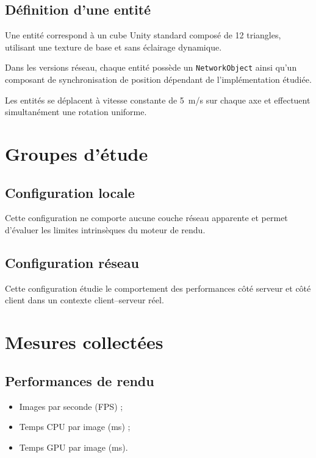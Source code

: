 \documentclass[11pt,a4paper]{article}
\begin{document}
\subsection{Définition d'une entité}

Une entité correspond à un cube Unity standard composé de 12 triangles, utilisant une texture de base et sans éclairage dynamique.

Dans les versions réseau, chaque entité possède un \texttt{NetworkObject} ainsi qu'un composant de synchronisation de position dépendant de l'implémentation étudiée.

Les entités se déplacent à vitesse constante de 5~m/s sur chaque axe et effectuent simultanément une rotation uniforme.

\section{Groupes d'étude}

\subsection{Configuration locale}

Cette configuration ne comporte aucune couche réseau apparente et permet d'évaluer les limites intrinsèques du moteur de rendu.

\subsection{Configuration réseau}

Cette configuration étudie le comportement des performances côté serveur et côté client dans un contexte client--serveur réel.

\section{Mesures collectées}

\subsection{Performances de rendu}

\begin{itemize}
\item Images par seconde (FPS) ;
\item Temps CPU par image (ms) ;
\item Temps GPU par image (ms).
\end{itemize}
\end{document}
